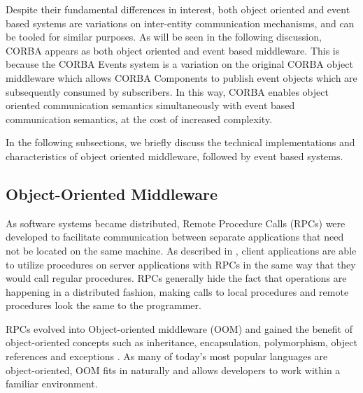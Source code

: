 \documentclass{acm_proc_article-sp}
\begin{document}
Despite their fundamental differences in interest, both object oriented and event based systems are variations on inter-entity communication mechanisms, and can be tooled for similar purposes. As will be seen in the following discussion, CORBA appears as both object oriented and event based middleware. This is because the CORBA Events system is a variation on the original CORBA object middleware \cite{Siegel:1999p8569,Emmerich:2007p8368} which allows CORBA Components to publish event objects which are subsequently consumed by subscribers. In this way, CORBA enables object oriented communication semantics simultaneously with event based communication semantics, at the cost of increased complexity.

In the following subsections, we briefly discuss the technical implementations and characteristics of  object oriented middleware, followed by event based systems. 





\subsection{Object-Oriented Middleware}
\label{sec:techobj}


As software systems became distributed, Remote Procedure Calls (RPCs) were developed to facilitate communication between separate applications that need not be located on the same machine.  As described in \cite{Vinoski:2004p8371}, client applications are able to utilize procedures on server applications with RPCs in the same way that they would call regular procedures.  RPCs generally hide the fact that operations are happening in a distributed fashion, making calls to local procedures and remote procedures look the same to the programmer.

RPCs evolved into Object-oriented middleware (OOM) and gained the benefit of object-oriented concepts such as inheritance, encapsulation, polymorphism, object references and exceptions \cite{Pinus:2006p8367,Vinoski:2004p8371}.  As many of today's most popular languages are object-oriented, OOM fits in naturally and allows developers to work within a familiar environment.
\end{document}
